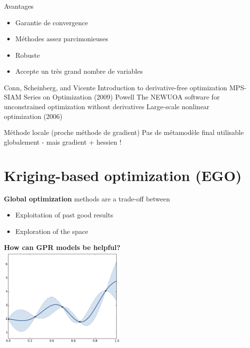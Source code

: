 \documentclass{beamer}
\begin{document}
\begin{frame}
\frametitle{}
\begin{block}{Avantages}
\begin{itemize}
 \item Garantie de convergence
 \item Méthodes assez parcimonieuses
 \item Robuste
 \item Accepte un très grand nombre de variables
\end{itemize}
\scriptsize{
 \begin{thebibliography}{1}
\beamertemplatearticlebibitems
     Conn, Scheinberg, and Vicente
         \newblock Introduction to derivative-free optimization
         \newblock MPS-SIAM Series on Optimization (2009)
          Powell
         \newblock The NEWUOA software for unconstrained optimization without derivatives
         \newblock Large-scale nonlinear optimization (2006)    
 \end{thebibliography}}
\end{block}

\begin{alertblock}{Méthode locale (proche méthode de gradient)}
Pas de métamodèle final utilisable globalement - mais gradient + hessien !
\end{alertblock}
\end{frame}
\section[EG0]{Kriging-based optimization (EGO)}
\begin{frame}{}
\textbf{Global optimization} methods are a trade-off between
\begin{itemize}
	\item Exploitation of past good results
	\item Exploration of the space
\end{itemize}
\vspace{3mm}
\begin{center}
\textbf{How can GPR models be helpful?}\\
\includegraphics[height=5cm]{figures/python/ego_0}
\end{center}
\end{frame}
\end{document}
